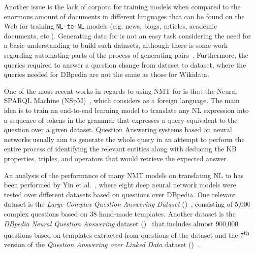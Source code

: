 Another issue is the lack of corpora for training \NLtoSPARQL{} models when compared to 
the enormous amount of documents in different languages that can be found on the Web for 
training \texttt{NL-to-NL} models (e.g. news, blogs, articles, academic documents, etc.). Generating 
data for \NLtoSPARQL{} is not an easy task considering the need for a basic \SPARQL{} understanding 
to build such datasets, although there is some work regarding automating parts 
of the process of generating \NLtoSPARQL{} pairs~\cite{dataset:dbnqa-hartmann-marx-soru-2018, 
dataset:lcquad-TrivediMDL17}. Furthermore, the queries required to answer a question change from 
dataset to dataset, where the \SPARQL{} queries needed for DBpedia are not the same as those for Wikidata.

One of the most recent works in regards to using NMT for \SPARQL{} is that 
the Neural SPARQL Machine (NSpM)~\cite{nmt:nspm-SoruMMPVEN17}, which considers \SPARQL{} as a foreign 
language. The main idea is to train an end-to-end learning model to translate any NL expression 
into a sequence of tokens in the \SPARQL{} grammar that expresses a query equivalent to the 
question over a given dataset. Question Answering systems based on neural networks usually 
aim to generate the whole \SPARQL{} query in an attempt to perform the entire process of 
identifying the relevant entities along with deducing the KB properties, triples, and operators 
that would retrieve the expected answer. 

An analysis of the performance of many NMT models on translating NL to \SPARQL{} 
has been performed by Yin et al.~\cite{nmt:nl-to-sparql-Yin19}, where eight deep neural network models 
were tested over different datasets based on questions over DBpedia. One relevant dataset is the 
\textit{Large Complex Question Answering Dataset} (\LCQuADone)~\cite{dataset:lcquad-TrivediMDL17}, 
consisting of 5,000 complex questions based on 38 hand-made templates. Another dataset is the 
\textit{DBpedia Neural Question Answering} dataset (\DBNQA)~\cite{dataset:dbnqa-hartmann-marx-soru-2018} 
that includes almost 900,000 questions based on templates extracted from questions of the \LCQuADone{} 
dataset and the 7\textsuperscript{th} version of the \textit{Question Answering over Linked Data} 
dataset (\QALDseven)~\cite{dataset:qald7-UsbeckNHKRN17}.

